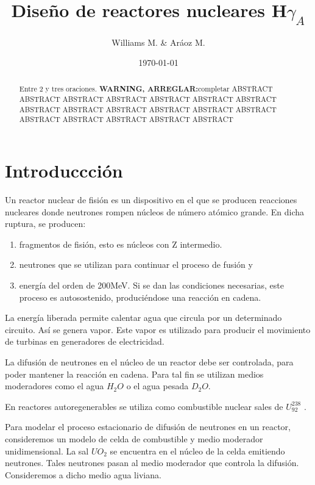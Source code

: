 \documentclass[11pt,a4paper]{emulateapj}
\def \HgA {H$\gamma_A$}
\def \warn {{\sffamily\bfseries\large WARNING, ARREGLAR:}}
\begin{document}
\title{Diseño de reactores nucleares \HgA}
\author{Williams M. \& Aráoz M.}
\date{\today}


\begin{abstract}
Entre 2 y tres oraciones.
\warn completar
ABSTRACT ABSTRACT ABSTRACT ABSTRACT ABSTRACT ABSTRACT ABSTRACT ABSTRACT ABSTRACT 
ABSTRACT ABSTRACT ABSTRACT ABSTRACT ABSTRACT ABSTRACT ABSTRACT ABSTRACT ABSTRACT 
\end{abstract}

\maketitle




\section{Introduccción}
Un reactor nuclear de fisión es un dispositivo en el que se producen reacciones nucleares
donde neutrones rompen núcleos de número atómico grande. En dicha ruptura, se
producen: 
\begin{enumerate}
	\item fragmentos de fisión, esto es núcleos con Z intermedio.
	\item neutrones que se utilizan para continuar el proceso de fusión y 
	\item energía del orden de 200MeV. Si se dan
las condiciones necesarias, este proceso es autosostenido, produciéndose una reacción en cadena.
\end{enumerate}
La energía liberada permite calentar agua que circula por un determinado circuito. Así
se genera vapor. Este vapor es utilizado para producir el movimiento de turbinas en
generadores de electricidad.

La difusión de neutrones en el núcleo de un reactor debe ser controlada, para poder mantener
 la reacción en cadena. Para tal fin se utilizan medios moderadores como el agua $H_2O$
o el agua pesada $D_2O$.


En reactores autoregenerables se utiliza como combustible nuclear sales de $U^{238}_{92}$ .

Para modelar el proceso estacionario de difusión de neutrones en un reactor, consideremos
un modelo de celda de combustible y medio moderador unidimensional. La sal $UO_2$ se
encuentra en el núcleo de la celda emitiendo neutrones. Tales neutrones pasan al medio
moderador que controla la difusión. Consideremos a dicho medio agua liviana.
\end{document}
